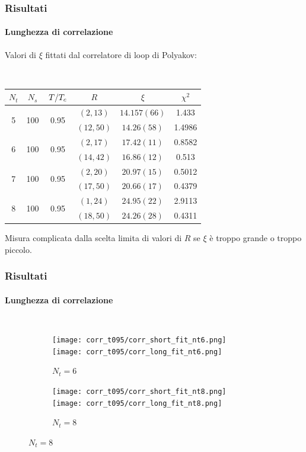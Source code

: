 \documentclass{beamer}
\begin{document}
\begin{frame}
	\frametitle{Risultati}
	\framesubtitle{Lunghezza di correlazione}
	
	Valori di $\xi$ fittati dal correlatore di loop di Polyakov:

	\

	\begin{table}
		\centering
		\begin{tabular}{|c|c|c|c|c|c|}
			\hline
			$N_t$ & $N_s$ & $\flatfrac{T}{T_c} $ & $R$ & $\xi$ & $\chi^2$ \\
			\hline
			\multirow{2}{*}{5} & \multirow{2}{*}{100} & \multirow{2}{*}{0.95}
					& $(2, 13)$ & $14.157(66)$ & 1.433 \\
				& & & $(12, 50)$ & $14.26(58)$ & 1.4986 \\
			\hline
			\multirow{2}{*}{6} & \multirow{2}{*}{100} & \multirow{2}{*}{0.95}
					& $(2, 17)$ & $17.42(11)$ & 0.8582 \\
				& & & $(14, 42)$ & $16.86(12)$ & 0.513 \\
			\hline
			\multirow{2}{*}{7} & \multirow{2}{*}{100} & \multirow{2}{*}{0.95}
					& $(2, 20)$ & $20.97(15)$ & 0.5012 \\
				& & & $(17, 50)$ & $20.66(17)$ & 0.4379 \\
			\hline
			\multirow{2}{*}{8} & \multirow{2}{*}{100} & \multirow{2}{*}{0.95}
					& $(1, 24)$ & $24.95(22)$ & 2.9113 \\
				& & & $(18, 50)$ & $24.26(28)$ & 0.4311 \\
			\hline
		\end{tabular}
	\end{table}

	Misura complicata dalla scelta limita di valori di $R$ se $\xi$ è troppo grande o troppo piccolo.
\end{frame}

\begin{frame}
	\frametitle{Risultati}
	\framesubtitle{Lunghezza di correlazione}

	\begin{columns}
		\column{\dimexpr\paperwidth-10pt}
			\begin{figure}
				\begin{subfigure}[h]{\textwidth}
					\texttt{[image: corr\_t095/corr\_short\_fit\_nt6.png]}
					\texttt{[image: corr\_t095/corr\_long\_fit\_nt6.png]}
					\caption{$N_t = 6$}
				\end{subfigure}
				
				\par\medskip

				\begin{subfigure}[h]{\textwidth}
					\texttt{[image: corr\_t095/corr\_short\_fit\_nt8.png]}
					\texttt{[image: corr\_t095/corr\_long\_fit\_nt8.png]}
					\caption{$N_t = 8$}
				\end{subfigure}
			\end{figure}
	  \end{columns}
\end{frame}
\end{document}
